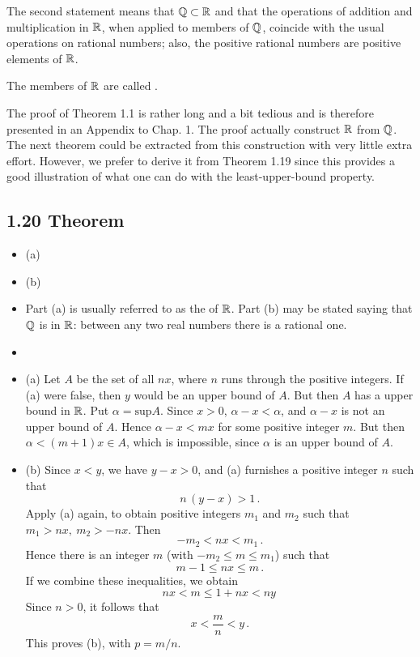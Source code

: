 The second statement means that $\mathbb{Q} \subset \mathbb{R}$ and that the operations of addition and multiplication in $\mathbb{R}$, when applied to members of $\mathbb{Q}$, coincide with the usual operations on rational numbers; also, the positive rational numbers are positive elements of $\mathbb{R}$.

The members of $\mathbb{R}$ are called .

The proof of Theorem 1.1 is rather long and a bit tedious and is therefore presented in an Appendix to Chap. 1. The proof actually construct $\mathbb{R}$ from $\mathbb{Q}$. The next theorem could be extracted from this construction with very little extra effort. However, we prefer to derive it from Theorem 1.19 since this provides a good illustration of what one can do with the least-upper-bound property. 


\subsection*{1.20 Theorem}
\begin{itemize}
\item[] (a) 
\item[] (b)  

\item[] Part (a) is usually referred to as the  of $\mathbb{R}$. Part (b) may be stated saying that $\mathbb{Q}$ is  in $\mathbb{R}$: between any two real numbers there is a rational one.
\item[] 
\item[] (a) Let $A$ be the set of all $nx$, where $n$ runs through the positive integers. If (a) were false, then $y$ would be an upper bound of $A$. But then $A$ has a  upper bound in $\mathbb{R}$. Put $\alpha = \text{sup} A$. Since $x > 0$, $\alpha - x < \alpha$, and 
$\alpha - x$ is not an upper bound of $A$. Hence $\alpha - x < mx$ for some positive integer $m$. But then $\alpha < (m + 1)x \in A$, which is impossible, since $\alpha$ is an upper bound of $A$.         
\item[] (b) Since $x < y$, we have $y - x > 0$, and (a) furnishes a positive integer $n$ such that $$n\,(y - x) > 1\,.$$
Apply (a) again, to obtain positive integers $m_1$ and $m_2$ such that $m_1 > nx,\:m_2 > -nx$. Then $$-m_2 < nx < m_1\,.$$ 
Hence there is an integer $m$ (with $-m_2 \leq m \leq m_1$) such that $$m - 1 \leq nx \leq m\,.$$ If we combine these inequalities, we obtain $$nx < m \leq 1 + nx < ny\,$$ Since $n > 0$, it follows that $$x < \frac{m}{n} < y\,.$$ This proves (b), with $p = m/n$. 
\end{itemize}

